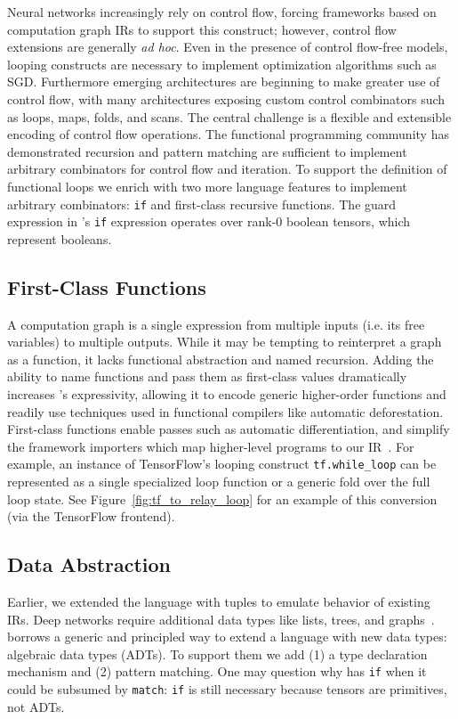   Neural networks increasingly rely on control flow, forcing frameworks based on computation graph IRs
  to support this construct; however, control flow extensions are generally \textit{ad hoc}.
  Even in the presence of control flow-free models, looping
    constructs are necessary to implement optimization algorithms
    such as SGD.
  Furthermore emerging architectures are beginning to make greater use of
     control flow, with many architectures exposing custom control
     combinators such as loops, maps, folds, and scans.
  The central challenge is a flexible and extensible encoding of
    control flow operations.
  The functional programming community has demonstrated recursion and pattern matching are sufficient
    to implement arbitrary combinators for control flow and iteration.
  To support the definition of functional loops we enrich \relay with two more language
    features to implement arbitrary combinators: \verb|if| and first-class recursive functions.
  The guard expression in \relay's \verb|if| expression operates over rank-0 boolean tensors,
    which represent booleans.

  \subsection{First-Class Functions}

  A computation graph is a single expression
    from multiple inputs (i.e. its free variables) to multiple outputs.
  While it may be tempting to reinterpret a graph as a function, it lacks functional abstraction
    and named recursion.
  Adding the ability to name functions and pass them as first-class values dramatically increases
    \relay's expressivity, allowing it to encode generic
    higher-order functions and readily use techniques used in functional
    compilers like automatic deforestation.
  First-class functions enable passes such as
    automatic differentiation, and simplify
    the framework importers which map higher-level programs to our IR~\cite{myia}.
  For example, an instance of TensorFlow's looping construct \verb|tf.while_loop|
    can be represented as a single specialized loop function
    or a generic fold over the full loop state.
  See Figure~\ref{fig:tf_to_relay_loop} for an example of this conversion (via
    the \relay TensorFlow frontend).

  \subsection{Data Abstraction}
  Earlier, we extended the language with tuples to
    emulate behavior of existing IRs.
  Deep networks require additional data types like lists,
    trees, and graphs~\cite{char-rnn, tree_lstm, graph_lstm}.
  \relay borrows a generic and principled way to
    extend a language with new data types:
    algebraic data types (ADTs).
  To support them we add (1) a type declaration mechanism and
    (2) pattern matching.
  One may question why \relay has \verb|if| when it could be subsumed by \verb|match|:
    \verb|if| is still necessary because tensors are primitives, not ADTs.

